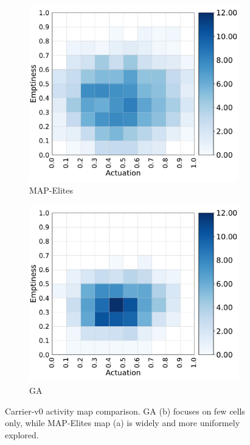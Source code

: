 \begin{figure}[H]
    \centering
    \begin{subfigure}[b]{0.49\textwidth}
         \centering
         \includegraphics[scale=0.45]{images/brain_opt/carrier/carrier_qd_ag}
         \caption{MAP-Elites}
    \end{subfigure}
    \hfill
    \begin{subfigure}[b]{0.49\textwidth}
         \centering
         \includegraphics[scale=0.45]{images/brain_opt/carrier/carrier_ga_ag}
         \caption{GA}
    \end{subfigure}
    \caption{Carrier-v0 activity map comparison. GA (b) focuses on few cells only, while MAP-Elites map (a) is widely and more uniformely explored.}
    \label{fig:qd_ga_carrier_ag}
\end{figure}

